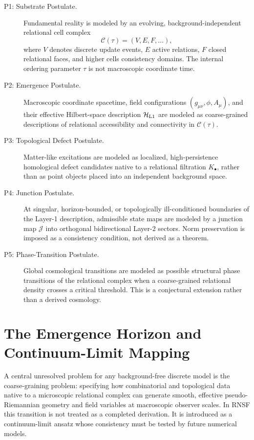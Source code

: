\documentclass[11pt]{article}
\newcommand{\Ccal}{\mathcal{C}}
\newcommand{\Hcal}{\mathcal{H}}
\newcommand{\Jmap}{\mathcal{J}}
\begin{document}
\begin{description}
    \item[P1: Substrate Postulate.] Fundamental reality is modeled by an evolving, background-independent relational cell complex
    \begin{equation}
        \Ccal(\tau)=(V,E,F,\ldots),
    \end{equation}
    where \(V\) denotes discrete update events, \(E\) active relations, \(F\) closed relational faces, and higher cells consistency domains. The internal ordering parameter \(\tau\) is not macroscopic coordinate time.

    \item[P2: Emergence Postulate.] Macroscopic coordinate spacetime, field configurations \((g_{\mu\nu},\phi,A_\mu)\), and their effective Hilbert-space description \(\Hcal_{\rm L1}\) are modeled as coarse-grained descriptions of relational accessibility and connectivity in \(\Ccal(\tau)\).

    \item[P3: Topological Defect Postulate.] Matter-like excitations are modeled as localized, high-persistence homological defect candidates native to a relational filtration \(K_\bullet\), rather than as point objects placed into an independent background space.

    \item[P4: Junction Postulate.] At singular, horizon-bounded, or topologically ill-conditioned boundaries of the Layer-1 description, admissible state maps are modeled by a junction map \(\Jmap\) into orthogonal bidirectional Layer-2 sectors. Norm preservation is imposed as a consistency condition, not derived as a theorem.

    \item[P5: Phase-Transition Postulate.] Global cosmological transitions are modeled as possible structural phase transitions of the relational complex when a coarse-grained relational density crosses a critical threshold. This is a conjectural extension rather than a derived cosmology.
\end{description}

\section{The Emergence Horizon and Continuum-Limit Mapping}
\label{sec:emergence-horizon}

A central unresolved problem for any background-free discrete model is the coarse-graining problem: specifying how combinatorial and topological data native to a microscopic relational complex can generate smooth, effective pseudo-Riemannian geometry and field variables at macroscopic observer scales. In RNSF this transition is not treated as a completed derivation. It is introduced as a continuum-limit ansatz whose consistency must be tested by future numerical models.
\end{document}
